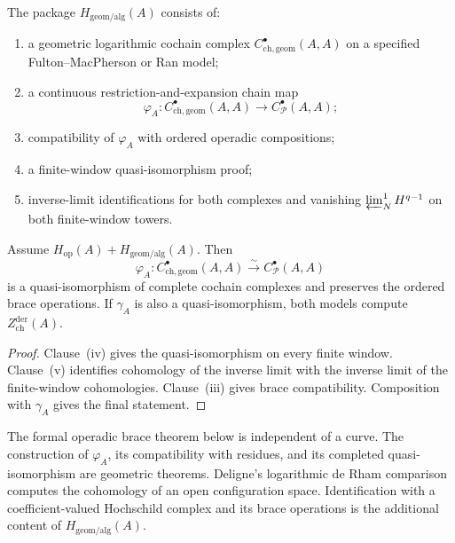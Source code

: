 \begin{definition}
\label{def:cct-geometric-algebraic-package}
The package \(H_{\mathrm{geom/alg}}(A)\) consists of:
\begin{enumerate}[label=\textup{(\roman*)}]
\item a geometric logarithmic cochain complex
 \(C^\bullet_{\mathrm{ch,geom}}(A,A)\) on a specified
 Fulton--MacPherson or Ran model;
\item a continuous restriction-and-expansion chain map
 \[
 \varphi_A\colon
 C^\bullet_{\mathrm{ch,geom}}(A,A)
 \longrightarrow C^\bullet_{\mathcal P}(A,A);
 \]
\item compatibility of \(\varphi_A\) with ordered operadic
 compositions;
\item a finite-window quasi-isomorphism proof;
\item inverse-limit identifications for both complexes and vanishing
 \(\varprojlim_N^1 H^{q-1}\) on both finite-window towers.
\end{enumerate}
\end{definition}

\begin{proposition}
\label{prop:geometric-algebraic-hochschild}
Assume \(H_{\mathrm{op}}(A)+H_{\mathrm{geom/alg}}(A)\).  Then
\[
 \varphi_A\colon
 C^\bullet_{\mathrm{ch,geom}}(A,A)
 \xrightarrow{\sim}
 C^\bullet_{\mathcal P}(A,A)
\]
is a quasi-isomorphism of complete cochain complexes and preserves the
ordered brace operations.  If \(\gamma_A\) is also a
quasi-isomorphism, both models compute
\(Z^{\mathrm{der}}_{\mathrm{ch}}(A)\).
\end{proposition}

\begin{proof}
Clause~\textup{(iv)} gives the quasi-isomorphism on every finite
window.  Clause~\textup{(v)} identifies cohomology of the inverse
limit with the inverse limit of the finite-window cohomologies.
Clause~\textup{(iii)} gives brace compatibility.  Composition with
\(\gamma_A\) gives the final statement.
\end{proof}

\begin{remark}
\label{rem:comparison-geometric-hoch}
The formal operadic brace theorem below is independent of a curve.
The construction of \(\varphi_A\), its compatibility with residues,
and its completed quasi-isomorphism are geometric theorems.  Deligne's
logarithmic de Rham comparison computes the cohomology of an open
configuration space.  Identification with a coefficient-valued
Hochschild complex and its brace operations is the additional content
of \(H_{\mathrm{geom/alg}}(A)\).
\end{remark}

